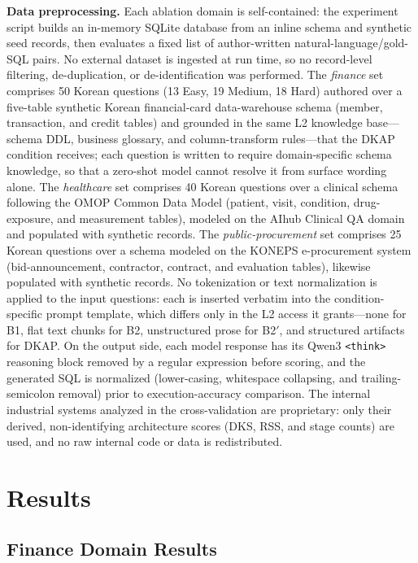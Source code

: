 \documentclass[fleqn,10pt,lineno]{wlpeerj}
\begin{document}
\textbf{Data preprocessing.} Each ablation domain is self-contained: the experiment script builds an in-memory SQLite database from an inline schema and synthetic seed records, then evaluates a fixed list of author-written natural-language/gold-SQL pairs. No external dataset is ingested at run time, so no record-level filtering, de-duplication, or de-identification was performed. The \emph{finance} set comprises 50 Korean questions (13 Easy, 19 Medium, 18 Hard) authored over a five-table synthetic Korean financial-card data-warehouse schema (member, transaction, and credit tables) and grounded in the same L2 knowledge base---schema DDL, business glossary, and column-transform rules---that the DKAP condition receives; each question is written to require domain-specific schema knowledge, so that a zero-shot model cannot resolve it from surface wording alone. The \emph{healthcare} set comprises 40 Korean questions over a clinical schema following the OMOP Common Data Model (patient, visit, condition, drug-exposure, and measurement tables), modeled on the AIhub Clinical QA domain and populated with synthetic records. The \emph{public-procurement} set comprises 25 Korean questions over a schema modeled on the KONEPS e-procurement system (bid-announcement, contractor, contract, and evaluation tables), likewise populated with synthetic records. No tokenization or text normalization is applied to the input questions: each is inserted verbatim into the condition-specific prompt template, which differs only in the L2 access it grants---none for B1, flat text chunks for B2, unstructured prose for B2$'$, and structured artifacts for DKAP. On the output side, each model response has its Qwen3 \texttt{<think>} reasoning block removed by a regular expression before scoring, and the generated SQL is normalized (lower-casing, whitespace collapsing, and trailing-semicolon removal) prior to execution-accuracy comparison. The internal industrial systems analyzed in the cross-validation are proprietary: only their derived, non-identifying architecture scores (DKS, RSS, and stage counts) are used, and no raw internal code or data is redistributed.


\section{Results}

\subsection{Finance Domain Results}
\label{sec:finance_results}
\end{document}
